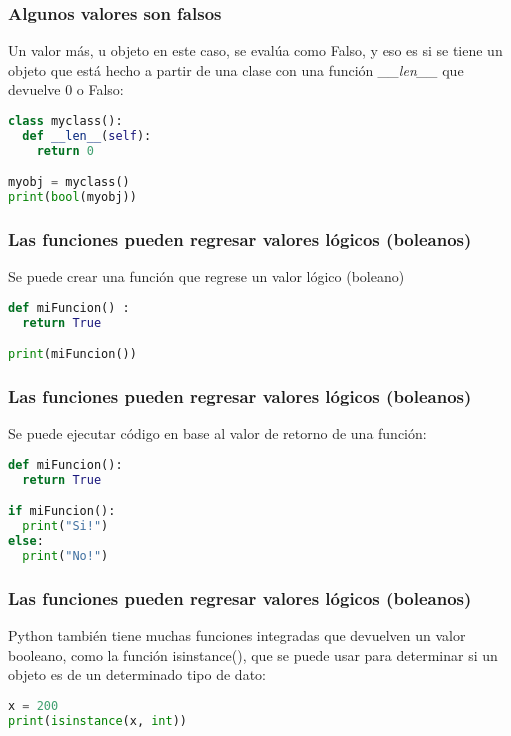 \begin{frame}[fragile]
  \frametitle{Algunos valores son falsos}

  Un valor más, u objeto en este caso, se evalúa como Falso, y eso es si
  se tiene un objeto que está hecho a partir de una clase con una función
  \emph{\_\_len\_\_} que devuelve 0 o Falso: 

  \vspace{\baselineskip}
  \begin{lstlisting}[language=Python]
class myclass():
  def __len__(self):
    return 0

myobj = myclass()
print(bool(myobj))
  \end{lstlisting}
\end{frame}

\begin{frame}[fragile]
  \frametitle{Las funciones pueden regresar valores lógicos (boleanos)}

  Se puede crear una función que regrese un valor lógico (boleano)

  \vspace{\baselineskip}
  \begin{lstlisting}[language=Python]
def miFuncion() :
  return True

print(miFuncion())
  \end{lstlisting}
\end{frame}

\begin{frame}[fragile]
  \frametitle{Las funciones pueden regresar valores lógicos (boleanos)}

  Se puede ejecutar código en base al valor de retorno de una función:

  \vspace{\baselineskip}
  \begin{lstlisting}[language=Python]
def miFuncion():
  return True

if miFuncion():
  print("Si!")
else:
  print("No!") 
  \end{lstlisting}
\end{frame}

\begin{frame}[fragile]
  \frametitle{Las funciones pueden regresar valores lógicos (boleanos)}

  Python también tiene muchas funciones integradas que devuelven un valor
  booleano, como la función \textcolor{codeKeyword2}{isinstance}(),
  que se puede usar para determinar si un objeto es de un determinado
  tipo de dato: 

  \vspace{\baselineskip}
  \begin{lstlisting}[language=Python]
x = 200
print(isinstance(x, int)) 
  \end{lstlisting}
\end{frame}

